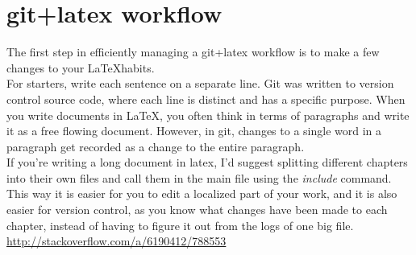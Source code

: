 \documentclass{article}
\begin{document}
\section{git+latex workflow}

The first step in efficiently managing a git+latex workflow is to
make a few changes to your \LaTeX habits. \\

For starters, write each sentence on a separate line. Git was written
to version control source code, where each line is distinct and has a
specific purpose. When you write documents in \LaTeX, you often think
in terms of paragraphs and write it as a free flowing document.
However, in git, changes to a single word in a paragraph get recorded
as a change to the entire paragraph. \\

If you're writing a long document in latex, I'd suggest splitting
different chapters into their own files and call them in the main
file using the \emph{include} command. This way it is easier for you
to edit a localized part of your work, and it is also easier for
version control, as you know what changes have been made to each
chapter, instead of having to figure it out from the logs of one big
file. \\

\url{http://stackoverflow.com/a/6190412/788553}
\end{document}
